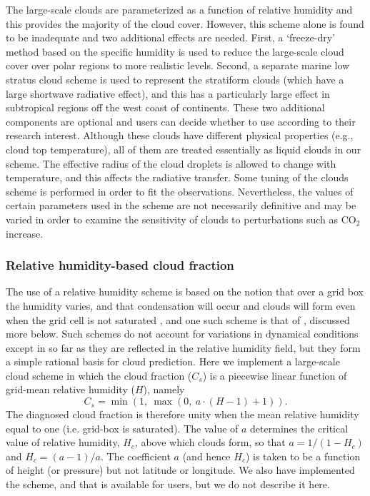 The large-scale clouds are parameterized as a function of relative humidity and this provides the majority of the cloud cover. However, this scheme alone is found to be inadequate and two additional effects are needed. First, a `freeze-dry' method based on the specific humidity is used to reduce the large-scale cloud cover over polar regions to more realistic levels. Second, a separate marine low stratus cloud scheme is used to represent the stratiform clouds (which have a large shortwave radiative effect), and this has a particularly large effect in subtropical regions off the west coast of continents. These two additional components are optional and users can decide whether to use according to their research interest. Although these clouds have different physical properties (e.g., cloud top temperature), all of them are treated essentially as liquid clouds in our scheme. The effective radius of the cloud droplets is allowed to change with temperature, and this affects the radiative transfer. Some tuning of the clouds scheme is performed in order to fit the observations. Nevertheless, the values of certain parameters used in the scheme are not necessarily definitive and may be varied in order to examine the sensitivity of clouds to perturbations such as CO$_2$ increase. 




\subsubsection{Relative humidity-based cloud fraction}
\label{sec:rh_cloud}

The use of a relative humidity scheme is based on the notion that over a grid box the humidity varies, and that condensation will occur and clouds will form even when the grid cell is not saturated \citep{Tompkins2005, Quaas2012}, and one such scheme is that of \citet{Sundqvist1989}, discussed more below. Such schemes do not account for variations in dynamical conditions except in so far as they are reflected in the relative humidity field, but they form a simple rational basis for cloud prediction. Here we implement a large-scale cloud scheme in which the cloud fraction ($C_{s}$) is a piecewise linear function of grid-mean relative humidity ($H$), namely
\begin{equation}
	C_{s}=\min\left(1, ~\max \left(0, ~ a \cdot (H -1) + 1 \right)\right).
	\label{eq:linear_cf_rh} 
\end{equation}
The diagnosed cloud fraction is therefore unity when the mean relative humidity equal to one (i.e. grid-box is saturated). The value of $a$ determines the critical value of relative humidity, $H_c$, above which clouds form, so that $a=1/\left(1-H_{c}\right)$ and $H_c = (a -1)/a$. The coefficient $a$ (and hence $H_{c}$) is taken to be a function of height (or pressure) but not latitude or longitude. We also have implemented the \citet{Sundqvist1989} scheme, and that is available for users, but we do not describe it here. 

